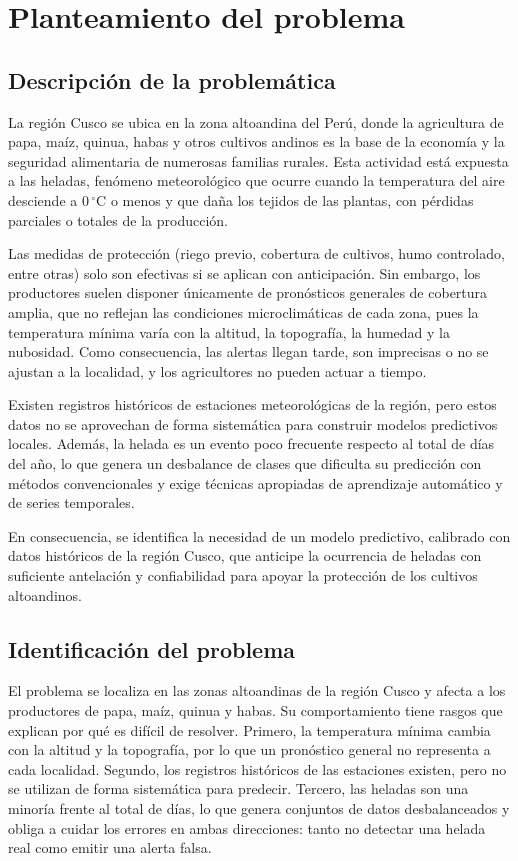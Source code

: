 \section{Planteamiento del problema}
\label{sec:problema}

\subsection{Descripción de la problemática}

La región Cusco se ubica en la zona altoandina del Perú, donde la agricultura de papa, maíz, quinua, habas y otros cultivos andinos es la base de la economía y la seguridad alimentaria de numerosas familias rurales. Esta actividad está expuesta a las heladas, fenómeno meteorológico que ocurre cuando la temperatura del aire desciende a $0\,^\circ$C o menos y que daña los tejidos de las plantas, con pérdidas parciales o totales de la producción.

Las medidas de protección (riego previo, cobertura de cultivos, humo controlado, entre otras) solo son efectivas si se aplican con anticipación. Sin embargo, los productores suelen disponer únicamente de pronósticos generales de cobertura amplia, que no reflejan las condiciones microclimáticas de cada zona, pues la temperatura mínima varía con la altitud, la topografía, la humedad y la nubosidad. Como consecuencia, las alertas llegan tarde, son imprecisas o no se ajustan a la localidad, y los agricultores no pueden actuar a tiempo.

Existen registros históricos de estaciones meteorológicas de la región, pero estos datos no se aprovechan de forma sistemática para construir modelos predictivos locales. Además, la helada es un evento poco frecuente respecto al total de días del año, lo que genera un desbalance de clases que dificulta su predicción con métodos convencionales y exige técnicas apropiadas de aprendizaje automático y de series temporales.

En consecuencia, se identifica la necesidad de un modelo predictivo, calibrado con datos históricos de la región Cusco, que anticipe la ocurrencia de heladas con suficiente antelación y confiabilidad para apoyar la protección de los cultivos altoandinos.

\subsection{Identificación del problema}

El problema se localiza en las zonas altoandinas de la región Cusco y afecta a los productores de papa, maíz, quinua y habas. Su comportamiento tiene rasgos que explican por qué es difícil de resolver. Primero, la temperatura mínima cambia con la altitud y la topografía, por lo que un pronóstico general no representa a cada localidad. Segundo, los registros históricos de las estaciones existen, pero no se utilizan de forma sistemática para predecir. Tercero, las heladas son una minoría frente al total de días, lo que genera conjuntos de datos desbalanceados y obliga a cuidar los errores en ambas direcciones: tanto no detectar una helada real como emitir una alerta falsa.


